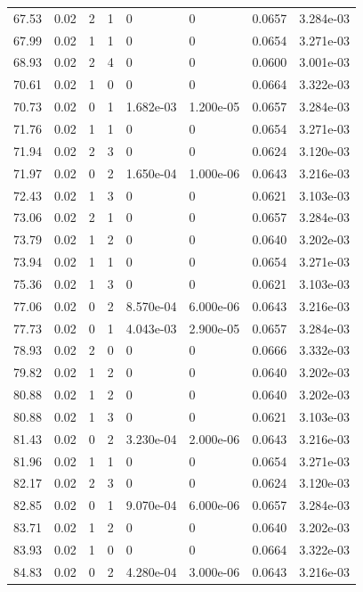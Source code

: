 \documentclass[preview]{standalone}
\begin{document}
{{{\begin{tabular}{L{1.2cm}C{1.2cm} C{0.3cm}C{0.5cm} C{1.4cm}C{1.4cm} C{1.4cm}C{1.4cm}}
  67.53  &  0.02  & 2     &  1 &  0  & 0  & 0.0657 &  3.284e-03   \\ 
  67.99  &  0.02  & 1     &  1 &  0  & 0  & 0.0654 &  3.271e-03   \\ 
  68.93  &  0.02  & 2     &  4 &  0  & 0  & 0.0600 &  3.001e-03   \\ 
  70.61  &  0.02  & 1     &  0 &  0  & 0  & 0.0664 &  3.322e-03   \\ 
  70.73  &  0.02  & 0     &  1 &  1.682e-03  & 1.200e-05  & 0.0657 &  3.284e-03   \\ 
  71.76  &  0.02  & 1     &  1 &  0  & 0  & 0.0654 &  3.271e-03   \\ 
  71.94  &  0.02  & 2     &  3 &  0  & 0  & 0.0624 &  3.120e-03   \\ 
  71.97  &  0.02  & 0     &  2 &  1.650e-04  & 1.000e-06  & 0.0643 &  3.216e-03   \\ 
  72.43  &  0.02  & 1     &  3 &  0  & 0  & 0.0621 &  3.103e-03   \\ 
  73.06  &  0.02  & 2     &  1 &  0  & 0  & 0.0657 &  3.284e-03   \\ 
  73.79  &  0.02  & 1     &  2 &  0  & 0  & 0.0640 &  3.202e-03   \\ 
  73.94  &  0.02  & 1     &  1 &  0  & 0  & 0.0654 &  3.271e-03   \\ 
  75.36  &  0.02  & 1     &  3 &  0  & 0  & 0.0621 &  3.103e-03   \\ 
  77.06  &  0.02  & 0     &  2 &  8.570e-04  & 6.000e-06  & 0.0643 &  3.216e-03   \\ 
  77.73  &  0.02  & 0     &  1 &  4.043e-03  & 2.900e-05  & 0.0657 &  3.284e-03   \\ 
  78.93  &  0.02  & 2     &  0 &  0  & 0  & 0.0666 &  3.332e-03   \\ 
  79.82  &  0.02  & 1     &  2 &  0  & 0  & 0.0640 &  3.202e-03   \\ 
  80.88  &  0.02  & 1     &  2 &  0  & 0  & 0.0640 &  3.202e-03   \\ 
  80.88  &  0.02  & 1     &  3 &  0  & 0  & 0.0621 &  3.103e-03   \\ 
  81.43  &  0.02  & 0     &  2 &  3.230e-04  & 2.000e-06  & 0.0643 &  3.216e-03   \\ 
  81.96  &  0.02  & 1     &  1 &  0  & 0  & 0.0654 &  3.271e-03   \\ 
  82.17  &  0.02  & 2     &  3 &  0  & 0  & 0.0624 &  3.120e-03   \\ 
  82.85  &  0.02  & 0     &  1 &  9.070e-04  & 6.000e-06  & 0.0657 &  3.284e-03   \\ 
  83.71  &  0.02  & 1     &  2 &  0  & 0  & 0.0640 &  3.202e-03   \\ 
  83.93  &  0.02  & 1     &  0 &  0  & 0  & 0.0664 &  3.322e-03   \\ 
  84.83  &  0.02  & 0     &  2 &  4.280e-04  & 3.000e-06  & 0.0643 &  3.216e-03   \\ 
\hline 
\end{tabular} 

}}}
\end{document}
